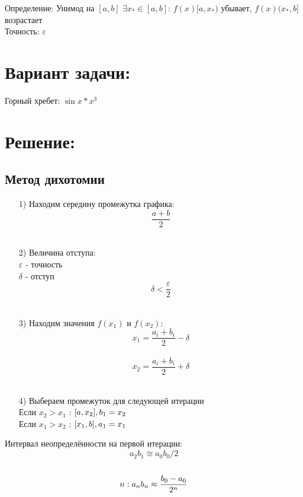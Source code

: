 \documentclass[fleqn]{article}
\begin{document}
Определение: Унимод на $[a, b]$  $ \exists x_* \in [a, b]$:  $f(x) [a,x_*)$ убывает, $f(x) (x_*, b]$  возрастает\\

Точность: $\varepsilon$

\section{Вариант задачи:}
Горный хребет: $\sin{x}*x^3$

\section{Решение:}
\subsection{Метод дихотомии}

\begin{itemize}
    \item[1)] Находим середину промежутка графика:\\
    $$\frac{a+b}{2}$$\\
    
    \item[2)] Величина отступа:\\
    $\varepsilon$ - точность\\
    $\delta$ - отступ\\
    $$\delta < \frac{\varepsilon}{2} $$\\
    
    \item[3)] Находим значения $f(x_1)$ и $f(x_2)$:\\
    $$x_1 = \frac{a_i+b_i}{2} - \delta$$\\
    $$x_2 = \frac{a_i+b_i}{2}+\delta$$\\
    
    \item[4)] Выбераем промежуток для следующей итерации\\
    Если $x_2>x_1$ : $[a, x_2],\space b_1=x_2$\\
    Если $x_1>x_2$ : $[x_1, b],\space a_1=x_1$\\
\end{itemize}

Интервал неопределённости на первой итерации:\\
$$a_2b_1 \cong a_0b_0/2$$\\
$$n:\space a_nb_n \approx \frac{b_0-a_0}{2^n}$$\\
\end{document}
